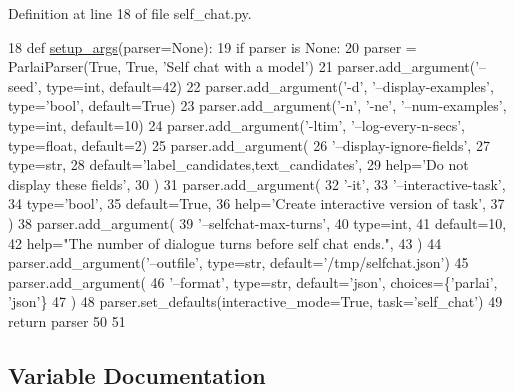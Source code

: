 Definition at line 18 of file self\+\_\+chat.\+py.


\begin{DoxyCode}
18 \textcolor{keyword}{def }\hyperlink{namespaceparlai_1_1scripts_1_1self__chat_a0899a6bf4e3d48c81a2c1b97f9696714}{setup\_args}(parser=None):
19     \textcolor{keywordflow}{if} parser \textcolor{keywordflow}{is} \textcolor{keywordtype}{None}:
20         parser = ParlaiParser(\textcolor{keyword}{True}, \textcolor{keyword}{True}, \textcolor{stringliteral}{'Self chat with a model'})
21     parser.add\_argument(\textcolor{stringliteral}{'--seed'}, type=int, default=42)
22     parser.add\_argument(\textcolor{stringliteral}{'-d'}, \textcolor{stringliteral}{'--display-examples'}, type=\textcolor{stringliteral}{'bool'}, default=\textcolor{keyword}{True})
23     parser.add\_argument(\textcolor{stringliteral}{'-n'}, \textcolor{stringliteral}{'-ne'}, \textcolor{stringliteral}{'--num-examples'}, type=int, default=10)
24     parser.add\_argument(\textcolor{stringliteral}{'-ltim'}, \textcolor{stringliteral}{'--log-every-n-secs'}, type=float, default=2)
25     parser.add\_argument(
26         \textcolor{stringliteral}{'--display-ignore-fields'},
27         type=str,
28         default=\textcolor{stringliteral}{'label\_candidates,text\_candidates'},
29         help=\textcolor{stringliteral}{'Do not display these fields'},
30     )
31     parser.add\_argument(
32         \textcolor{stringliteral}{'-it'},
33         \textcolor{stringliteral}{'--interactive-task'},
34         type=\textcolor{stringliteral}{'bool'},
35         default=\textcolor{keyword}{True},
36         help=\textcolor{stringliteral}{'Create interactive version of task'},
37     )
38     parser.add\_argument(
39         \textcolor{stringliteral}{'--selfchat-max-turns'},
40         type=int,
41         default=10,
42         help=\textcolor{stringliteral}{"The number of dialogue turns before self chat ends."},
43     )
44     parser.add\_argument(\textcolor{stringliteral}{'--outfile'}, type=str, default=\textcolor{stringliteral}{'/tmp/selfchat.json'})
45     parser.add\_argument(
46         \textcolor{stringliteral}{'--format'}, type=str, default=\textcolor{stringliteral}{'json'}, choices=\{\textcolor{stringliteral}{'parlai'}, \textcolor{stringliteral}{'json'}\}
47     )
48     parser.set\_defaults(interactive\_mode=\textcolor{keyword}{True}, task=\textcolor{stringliteral}{'self\_chat'})
49     \textcolor{keywordflow}{return} parser
50 
51 
\end{DoxyCode}


\subsection{Variable Documentation}
\mbox{\label{namespaceparlai_1_1scripts_1_1self__chat_af9db75a43048606dded47ed0003b9014}} 
